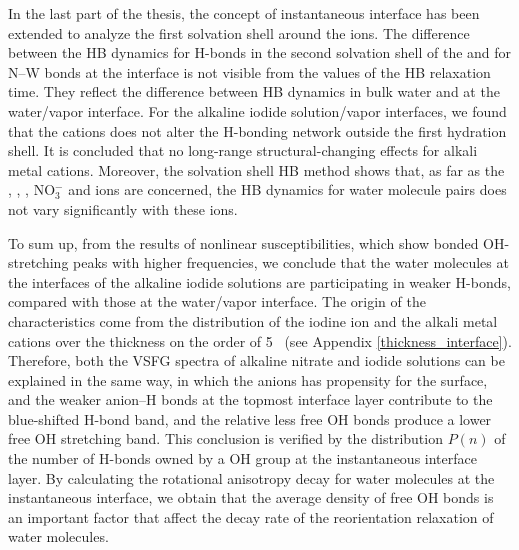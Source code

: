 In the last part of the thesis, the concept of instantaneous interface has been extended to analyze the first solvation shell around the ions.
The difference between the HB dynamics for H-bonds in the second solvation shell of the \Li and for N--W bonds 
at the interface is not visible from the values of the HB relaxation time. They reflect the difference between HB dynamics in 
bulk water and at the water/vapor interface. For the alkaline iodide solution/vapor interfaces, we found 
that the cations does not alter the H-bonding network outside the first hydration shell. 
It is concluded that no long-range structural-changing effects for alkali metal cations.
Moreover, the solvation shell HB method shows that, 
as far as the \Li, \Na, \K, NO$^-_3$ and \I ions are concerned, 
the HB dynamics for water molecule pairs does not vary significantly with these ions.

To sum up, from the results of nonlinear susceptibilities, which show bonded OH-stretching peaks with higher frequencies, 
we conclude that the water molecules at the interfaces of the alkaline iodide solutions are participating 
in weaker H-bonds, compared with those at the water/vapor interface. 
The origin of the characteristics come from the distribution of the iodine ion and the alkali metal cations
over the thickness on the order of 5 \A\ (see Appendix \ref{thickness_interface}).
Therefore, both the VSFG spectra of alkaline nitrate and iodide solutions can be explained in the same way, 
in which the anions has propensity for the surface, and the weaker anion--H bonds at the topmost interface layer contribute to the blue-shifted H-bond band,
and the relative less free OH bonds produce a lower free OH stretching band.
This conclusion is verified by the distribution $P(n)$ of the number of H-bonds owned by a OH group at the instantaneous interface layer. 
By calculating the rotational anisotropy decay for water molecules at the instantaneous interface, 
we obtain that the average density of free OH bonds is an important factor that affect the decay rate of the reorientation relaxation of water molecules.

